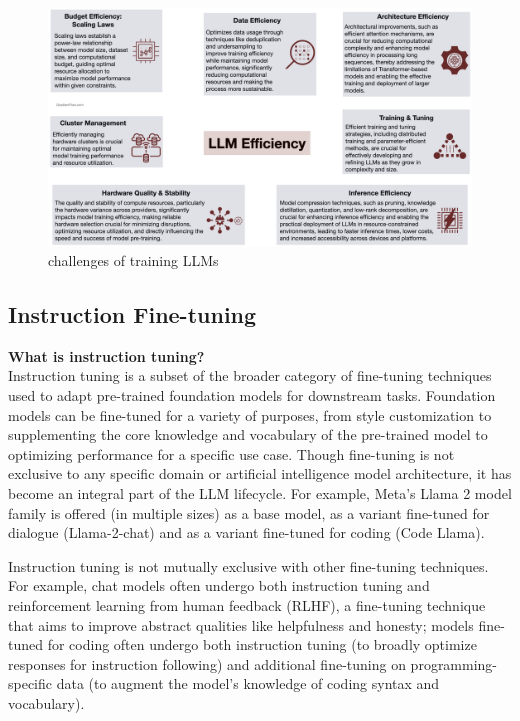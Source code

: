 \begin{figure}[h!]
	\centering
	\includegraphics[scale=0.2]{figures/llm computational resources.jpeg}
	\caption{challenges of training LLMs }
\end{figure}
\newpage

\subsection{Instruction Fine-tuning} 

\hfill \break
\textbf{What is instruction tuning?} \\

\hfill \break
Instruction tuning is a subset of the broader category of fine-tuning techniques used to adapt pre-trained foundation models for downstream tasks. Foundation models can be fine-tuned for a variety of purposes, from style customization to supplementing the core knowledge and vocabulary of the pre-trained model to optimizing performance for a specific use case. Though fine-tuning is not exclusive to any specific domain or artificial intelligence model architecture, it has become an integral part of the LLM lifecycle. For example, Meta’s Llama 2 model family is offered (in multiple sizes) as a base model, as a variant fine-tuned for dialogue (Llama-2-chat) and as a variant fine-tuned for coding (Code Llama).


\hfill \break
Instruction tuning is not mutually exclusive with other fine-tuning techniques. For example, chat models often undergo both instruction tuning and reinforcement learning from human feedback (RLHF), a fine-tuning technique that aims to improve abstract qualities like helpfulness and honesty; models fine-tuned for coding often undergo both instruction tuning (to broadly optimize responses for instruction following) and additional fine-tuning on programming-specific data (to augment the model’s knowledge of coding syntax and vocabulary).

